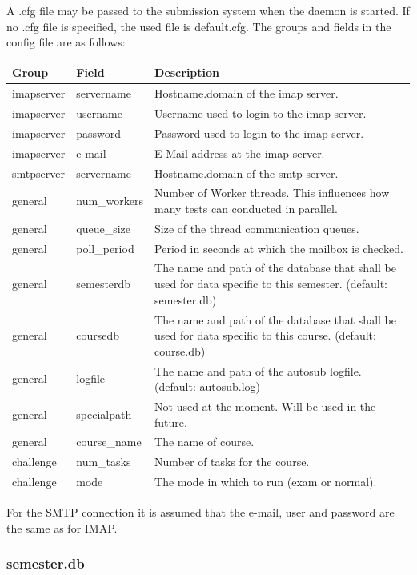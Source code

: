A .cfg file may be passed to the submission system when the daemon is started. If no .cfg file
is specified, the used file is default.cfg. The groups and fields in the config file are as follows:
\begin{tabular}{|p{4cm}|p{4cm}|p{5cm}|}
\hline

{\bf Group} & {\bf Field} & {\bf Description} \\
\hline
\hline
imapserver & servername & Hostname.domain of the imap server.\\
\hline
imapserver & username & Username used to login to the imap server. \\
\hline
imapserver & password & Password used to login to the imap server. \\
\hline
imapserver & e-mail & E-Mail address at the imap server. \\
\hline
\hline
smtpserver & servername & Hostname.domain of the smtp server.\\
\hline
\hline
general & num\_workers & Number of Worker threads. This influences how many
tests can conducted in parallel. \\
\hline
general & queue\_size & Size of the thread communication queues.\\
\hline
general & poll\_period & Period in seconds at which the mailbox is checked.\\
\hline
general & semesterdb & The name and path of the database that shall be used for data specific to
    this semester. (default: semester.db)\\
\hline
general & coursedb & The name and path of the database that shall be used for data specific to
    this course. (default: course.db)\\
\hline
general & logfile & The name and path of the autosub logfile. (default: autosub.log)\\
\hline
general & specialpath & Not used at the moment. Will be used in the future.\\
\hline
general & course\_name & The name of course.\\
\hline
\hline
challenge & num\_tasks & Number of tasks for the course.\\
\hline
challenge & mode & The mode in which to run (exam or normal).\\
\hline
\end{tabular}

For the SMTP connection it is assumed that the e-mail, user and password are the same as for IMAP.


\subsubsection{semester.db}

